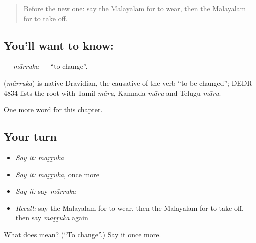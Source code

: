 \label{lesson:ML-C223-marruka}



\begin{quote}
Before the new one: say the Malayalam for to wear, then the Malayalam for to take off.
\end{quote}

\subsection*{You'll want to know: }
\textbf{} — \emph{māṟṟuka} — \textquotedblleft{}to change\textquotedblright{}.

\begin{cousinweb}
\textbf{} (\emph{māṟṟuka}) is native Dravidian, the causative of the verb \textquotedblleft{}to be changed\textquotedblright{}; DEDR 4834 lists the root with Tamil \emph{māṟu}, Kannada \emph{māṟu} and Telugu \emph{māṟu}.
\end{cousinweb}

\begin{grammarlens}[title={What you've built}]
One more word for this chapter.
\end{grammarlens}

\subsection*{Your turn}
\begin{itemize}
\raggedright
  \item \emph{Say it:} \emph{māṟṟuka}
  \item \emph{Say it:} \emph{māṟṟuka}, once more
  \item \emph{Say it:} say \emph{māṟṟuka}
  \item \emph{Recall:} say the Malayalam for to wear, then the Malayalam for to take off, then say \emph{māṟṟuka} again
\end{itemize}

\begin{tcolorbox}[breakable,colback=teal!4,colframe=teal!35!black,title={Before you move on}]
What does  mean? (\textquotedblleft{}To change\textquotedblright{}.) Say it once more.
\end{tcolorbox}
